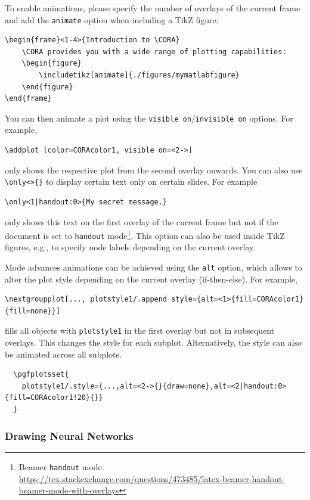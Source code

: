 \documentclass{article}
\begin{document}
To enable animations, please specify the number of overlays of the current frame and add the \texttt{animate} option when including a TikZ figure:
\begin{verbatim}
\begin{frame}<1-4>{Introduction to \CORA}
    \CORA provides you with a wide range of plotting capabilities:
    \begin{figure}
        \includetikz[animate]{./figures/mymatlabfigure}
    \end{figure}
\end{frame}
\end{verbatim}
You can then animate a plot using the \texttt{visible on}/\texttt{invisible on} options. For example,
\begin{verbatim}
\addplot [color=CORAcolor1, visible on=<2->]
\end{verbatim}
only shows the respective plot from the second overlay onwards.
You can also use \verb|\only<>{}| to display certain text only on certain slides.
For example
\begin{verbatim}
\only<1|handout:0>{My secret message.}
\end{verbatim}
only shows this text on the first overlay of the current frame but not if the document is set to \texttt{handout} mode\footnote{Beamer \texttt{handout} mode: \url{https://tex.stackexchange.com/questions/473485/latex-beamer-handout-beamer-mode-with-overlays}}.
This option can also be used inside TikZ figures, e.g., to specify node labels depending on the current overlay.

Mode advances animations can be achieved using the \texttt{alt} option,
which allows to alter the plot style depending on the current overlay (if-then-else).
For example,
\begin{verbatim}
\nextgroupplot[..., plotstyle1/.append style={alt=<1>{fill=CORAcolor1}{fill=none}}]
\end{verbatim}
fills all objects with \texttt{plotstyle1} in the first overlay but not in subsequent overlays.
This changes the style for each subplot. Alternatively, the style can also be animated across all subplots.
\begin{verbatim}
  \pgfplotsset{
    plotstyle1/.style={...,alt=<2->{}{draw=none},alt=<2|handout:0>{fill=CORAcolor1!20}{}}
  }
\end{verbatim}

\subsubsection{Drawing Neural Networks}
\end{document}
